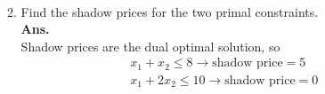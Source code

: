 \documentclass[12pt]{article}
\begin{document}
\begin{enumerate}
\begin{enumerate}
\begin{align*}
                        \end{align*}
                  \item Find the shadow prices for the two primal constraints.\\
                        \textbf{Ans.}\\
                        Shadow prices are the dual optimal solution, so
                        \begin{align*}
                              x_1 + x_2 \leq 8 \rightarrow \text{shadow price} = 5 \\
                              x_1 + 2x_2 \leq 10 \rightarrow \text{shadow price} = 0
                        \end{align*}
            \end{enumerate}
\end{enumerate}
\end{document}
